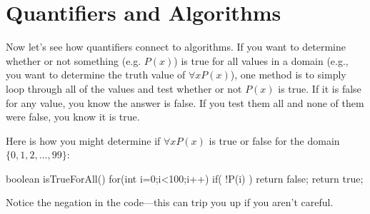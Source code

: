 %

\newpage

\section{Quantifiers and Algorithms}\label{section:quantsAndAlgs}

Now let's see how quantifiers connect to algorithms.  
If you want to determine whether or not something (e.g. $P(x)$) is true for all values in a domain
(e.g., you want to determine the truth value of $\forall x P(x)$), 
one method is to simply loop through all of the values and test whether or not $P(x)$ is true.  
If it is false for any value, you know the answer is false.  
If you test them all and none of them were false, you know it is true.


\begin{exa}
Here is how you might determine if $\forall x P(x)$ is true or false for the 
domain $\{0, 1, 2, \ldots, 99\}$:
{\small
\begin{code}
    boolean isTrueForAll() {
        for(int i=0;i<100;i++) {
            if( !P(i) ) {
                return false;
            }
        }
        return true;
    }
\end{code}
}

Notice the negation in the code---this can trip you up if you aren't careful.
\end{exa}

